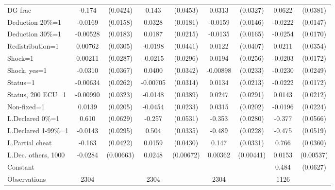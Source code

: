 \begin{tabular}{l|cccccc|cc}
DG frac         &   -0.174\sym{***}& (0.0424)&    0.143\sym{***}& (0.0453)&   0.0313         & (0.0327)&   0.0622         & (0.0381)\\
Deduction 20\%=1&  -0.0169         & (0.0158)&   0.0328\sym{*}  & (0.0181)&  -0.0159         & (0.0146)&  -0.0222         & (0.0147)\\
Deduction 30\%=1& -0.00528         & (0.0183)&   0.0187         & (0.0215)&  -0.0135         & (0.0165)&  -0.0254         & (0.0170)\\
Redistribution=1&  0.00762         & (0.0305)&  -0.0198         & (0.0441)&   0.0122         & (0.0407)&   0.0211         & (0.0354)\\
Shock=1         &  0.00211         & (0.0287)&  -0.0215         & (0.0296)&   0.0194         & (0.0256)&  -0.0203         & (0.0172)\\
Shock, yes=1    &  -0.0310         & (0.0367)&   0.0400         & (0.0342)& -0.00898         & (0.0233)&  -0.0230         & (0.0249)\\
Status=1        & -0.00634         & (0.0262)& -0.00705         & (0.0314)&   0.0134         & (0.0213)&  -0.0222         & (0.0172)\\
Status, 200 ECU=1& -0.00990         & (0.0323)&  -0.0148         & (0.0389)&   0.0247         & (0.0291)&   0.0143         & (0.0212)\\
Non-fixed=1     &   0.0139         & (0.0205)&  -0.0454\sym{*}  & (0.0233)&   0.0315         & (0.0202)&  -0.0196         & (0.0224)\\
L.Declared 0\%=1&    0.610\sym{***}& (0.0629)&   -0.257\sym{***}& (0.0531)&   -0.353\sym{***}& (0.0280)&   -0.377\sym{***}& (0.0566)\\
L.Declared 1-99\%=1&  -0.0143         & (0.0295)&    0.504\sym{***}& (0.0335)&   -0.489\sym{***}& (0.0228)&   -0.475\sym{***}& (0.0519)\\
L.Partial cheat &   -0.163\sym{***}& (0.0422)&   0.0159         & (0.0430)&    0.147\sym{***}& (0.0331)&    0.766\sym{***}& (0.0360)\\
L.Dec. others, 1000&  -0.0284\sym{***}&(0.00663)&   0.0248\sym{***}&(0.00672)&  0.00362         &(0.00441)&   0.0153\sym{***}&(0.00537)\\
Constant        &                  &         &                  &         &                  &         &    0.484\sym{***}& (0.0627)\\
\hline
Observations    &     2304         &         &     2304         &         &     2304         &         &     1126         &         \\

\end{tabular}
